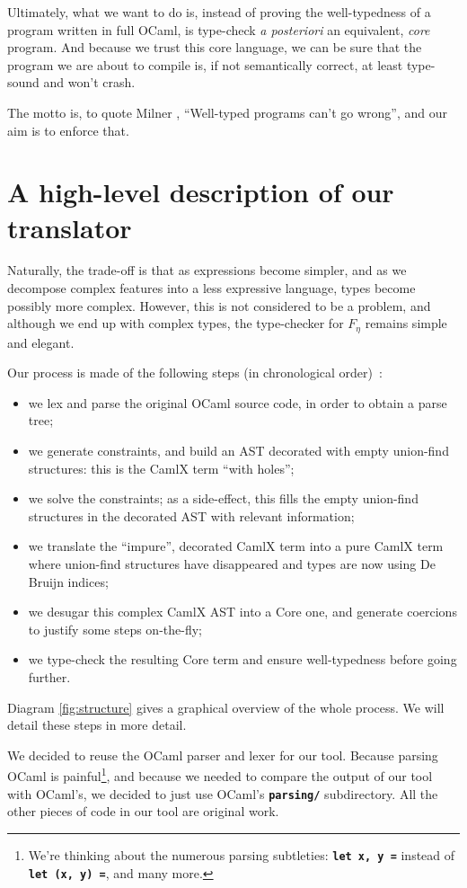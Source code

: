 \documentclass[10pt,a4paper,twoside,titlepage,twocolumn]{article}
\newcommand{\code}[1]{\textbf{\texttt{#1}}}
\begin{document}
Ultimately, what we want to do is, instead of proving the well-typedness of a
program written in full OCaml, is type-check \emph{a posteriori} an equivalent,
\emph{core} program. And because we trust this core language, we can be sure
that the program we are about to compile is, if not semantically correct, at
least type-sound and won't crash.

The motto is, to quote Milner \cite{milner1978theory}, ``Well-typed programs
can't go wrong'', and our aim is to enforce that.

\section{A high-level description of our translator}

Naturally, the trade-off is that as expressions become simpler, and as we
decompose complex features into a less expressive language, types become
possibly more complex. However, this is not considered to be a problem, and
although we end up with complex types, the type-checker for $F_\eta$ remains
simple and elegant.

Our process is made of the following steps (in chronological order)~:
\begin{itemize}
  \item we lex and parse the original OCaml source code, in order to obtain a
    parse tree;
  \item we generate constraints, and build an AST decorated with empty
    union-find structures: this is the CamlX term ``with holes'';
  \item we solve the constraints; as a side-effect, this fills the empty
    union-find structures in the decorated AST with relevant information;
  \item we translate the ``impure'', decorated CamlX term into a pure CamlX term
    where union-find structures have disappeared and types are now using De
    Bruijn indices;
  \item we desugar this complex CamlX AST into a Core one, and generate
    coercions to justify some steps on-the-fly;
  \item we type-check the resulting Core term and ensure well-typedness before
    going further.
\end{itemize}

Diagram \vref{fig:structure} gives a graphical overview of the whole process. We
will detail these steps in more detail.

We decided to reuse the OCaml parser and lexer for our tool. Because parsing
OCaml is painful\footnote{We're thinking about the numerous parsing subtleties:
\code{let x, y =} instead of \code{let (x, y) =}, and many more.}, and because
we needed to compare the output of our tool with OCaml's, we decided to just use
OCaml's \code{parsing/} subdirectory. All the other pieces of code in our tool
are original work.
\end{document}
